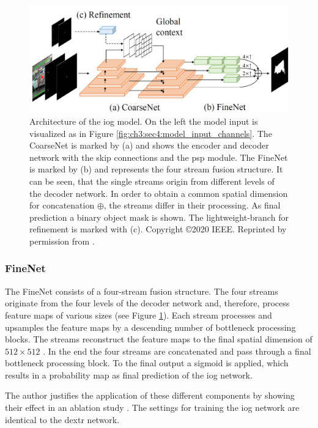 \begin{figure}
	\includegraphics[width=\linewidth]{figures/chap34_iog_arch.png}
	\caption[IOG Architecture]{		
		Architecture of the \gls{iog} model.
		On the left the model input is visualized as in Figure \ref{fig:ch3:sec4:model_input_channels}.
		The CoarseNet is marked by (a) and shows the encoder and decoder network with the skip connections and the \gls{psp} module.
		The FineNet is marked by (b) and represents the four stream fusion structure.
		It can be seen, that the single streams origin from different levels of the decoder network.
		In order to obtain a common spatial dimension for concatenation $ \oplus $, the streams differ in their processing.
		As final prediction a binary object mask is shown.
		The lightweight-branch for refinement is marked with (c).
		Copyright \copyright 2020 IEEE. Reprinted by permission from \cite{Zha20-IOG}.
	}
	\label{fig:ch3:sec4:arch}
\end{figure}

\subsubsection{FineNet}
The FineNet consists of a four-stream fusion structure.
The four streams originate from the four levels of the decoder network and, therefore, process feature maps of various sizes (see Figure \ref{fig:ch3:sec4:arch}).
Each stream processes and upsamples the feature maps by a descending number of bottleneck processing blocks.
The streams reconstruct the feature maps to the final spatial dimension of $512 \times 512$ .
In the end the four streams are concatenated and pass through a final bottleneck processing block.
To the final output a sigmoid is applied, which results in a probability map as final prediction of the \gls{iog} network.

The author justifies the application of these different components by showing their effect in an ablation study \cite{Zha20-IOG}.
The settings for training the \gls{iog} network are identical to the \gls{dextr} network.

